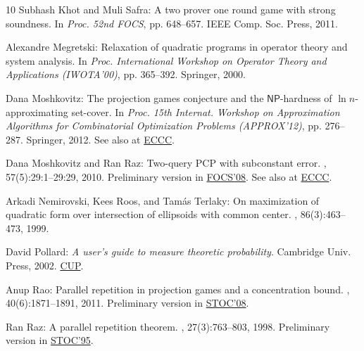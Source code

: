 \begin{thebibliography}{10}
{\sc Subhash Khot and Muli Safra}: A two prover one round game with strong
  soundness.
\newblock In {\em Proc. 52nd FOCS}, pp. 648--657. IEEE Comp. Soc. Press, 2011.

{\sc Alexandre Megretski}: Relaxation of quadratic programs in operator theory
  and system analysis.
\newblock In {\em Proc. International Workshop on Operator Theory and
  Applications (IWOTA'00)}, pp. 365--392. Springer, 2000.
\newblock [\epfmtdoi{10.1007/978-3-0348-8362-7\_15}]

{\sc Dana Moshkovitz}: The projection games conjecture and the
  $\mathsf{NP}$-hardness of $\ln n$-approximating set-cover.
\newblock In {\em Proc. 15th Internat. Workshop on Approximation Algorithms for
  Combinatorial Optimization Problems (APPROX'12)}, pp. 276--287. Springer,
  2012.
\newblock See also at \href{http://eccc.hpi-web.de/report/2011/112/}{ECCC}.
\newblock [\epfmtdoi{10.1007/978-3-642-32512-0\_24}]

{\sc Dana Moshkovitz and Ran Raz}: Two-query {PCP} with subconstant error.
, 57(5):29:1--29:29, 2010.
\newblock Preliminary version in
  \href{http://dx.doi.org/10.1109/FOCS.2008.60}{FOCS'08}. See also at
  \href{http://eccc.hpi-web.de/report/2008/071/}{ECCC}.
\newblock [\epfmtdoi{10.1145/1754399.1754402}]

{\sc Arkadi Nemirovski, Kees Roos, and Tam{\'a}s Terlaky}: On maximization of
  quadratic form over intersection of ellipsoids with common center.
, 86(3):463--473, 1999.
\newblock [\epfmtdoi{10.1007/s101070050100}]

{\sc David Pollard}: {\em A user's guide to measure theoretic probability}.
\newblock Cambridge Univ. Press, 2002.
\newblock
  \href{http://www.cambridge.org/ar/academic/subjects/statistics-probability/probability-theory-and-stochastic-processes/users-guide-measure-theoretic-probability}{CUP}.

{\sc Anup Rao}: Parallel repetition in projection games and a concentration
  bound.
, 40(6):1871--1891, 2011.
\newblock Preliminary version in
  \href{http://dx.doi.org/10.1145/1374376.1374378}{STOC'08}.
\newblock [\epfmtdoi{10.1137/080734042}]

{\sc Ran Raz}: A parallel repetition theorem.
, 27(3):763--803, 1998.
\newblock Preliminary version in
  \href{http://dx.doi.org/10.1145/225058.225181}{STOC'95}.
\newblock [\epfmtdoi{10.1137/S0097539795280895}]


\end{thebibliography}
